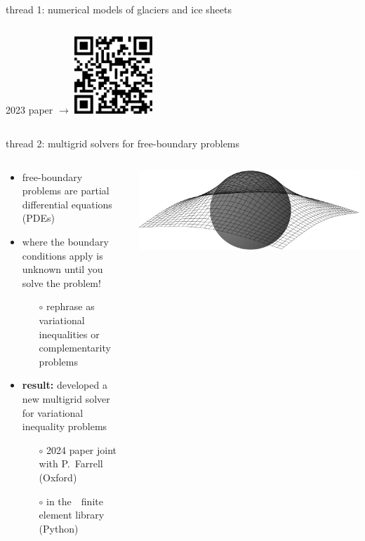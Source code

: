 \documentclass[svgnames,
               hyperref={colorlinks,citecolor=DeepPink4,linkcolor=FireBrick,urlcolor=Maroon},
               usepdftitle=false]  %
               {beamer}
\begin{document}
\begin{frame}{thread 1: numerical models of glaciers and ice sheets}
\begin{columns}
\begin{column}{0.55\textwidth}
\vspace{5mm}
\hfill {\tiny 2023 paper $\to$} \quad \href{https://doi.org/10.1017/jog.2022.113}{\includegraphics[width=0.22\textwidth]{figs/QRperformance.png}}
\end{column}
\end{columns}
\end{frame}


\begin{frame}{thread 2: multigrid solvers for free-boundary problems}

\begin{columns}
\begin{column}{0.6\textwidth}
\begin{itemize}
\item {\color{FireBrick} free-boundary problems} are partial differential equations (PDEs)
\item where the boundary conditions apply is unknown until you solve the problem!
    \begin{itemize}
    \item[$\circ$] rephrase as variational inequalities or complementarity problems
    \end{itemize}
\item \textbf{result:} developed a new {\color{FireBrick} multigrid solver} for variational inequality problems
    \begin{itemize}
    \item[$\circ$] 2024 paper joint with P.~Farrell (Oxford)
    \item[$\circ$] in the \,\, finite element library (Python)
    \end{itemize}
\end{itemize}
\end{column}
\begin{column}{0.4\textwidth}
{\centering

\includegraphics[width=\textwidth]{figs/obstacle65.pdf}

}
\end{column}
\end{columns}
\end{frame}
\end{document}
